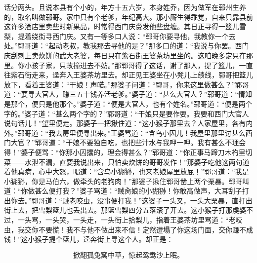 话分两头。且说本县有个小的，年方十五六岁，本身姓乔，因为做军在郓州生养的，取名叫做郓哥。家中只有个老爹，年纪高大。那小厮生得乖觉，自来只靠县前这许多酒店里卖些时新果品，时常得西门庆赍发他些盘缠。其日正寻得一篮儿雪梨，提着绕街寻西门庆。又有一等多口人说：“郓哥你要寻他，我教你一个去处。”郓哥道：“起动老叔，教我那去寻他的是？”那多口的道：“我说与你罢。西门庆刮剌上卖炊饼的武大老婆，每日只在紫石街王婆茶坊里坐的。这咱晚多定只在那里。你小孩子家，只故撞进去不妨。”那郓哥得了这话，谢了那人，提了篮儿，一直往紫石街走来，迳奔入王婆茶坊里去。却正见王婆坐在小凳儿上绩线，郓哥把篮儿放下，看着王婆道：“干娘！声喏。”那婆子问道：“郓哥，你来这里做甚么？”郓哥道：“要寻大官人，赚三五十钱养活老爹。”婆子道：“甚么大官人？”郓哥道：“情知是那个，便只是他那个。”婆子道：“便是大官人，也有个姓名。”郓哥道：“便是两个字的。”婆子道：“甚么两个字的？”郓哥道：“干娘只是要作耍。我要和西门大官人说句话儿！”望里便走。那婆子一把揪住道：“这小猴子那里去？人家屋里，各有内外。”郓哥道：“我去房里便寻出来。”王婆骂道：“含乌小囚儿！我屋里那里讨甚么西门大官？”郓哥道：“干娘不要独自吃，也把些汁水与我呷一呷。我有甚么不理会得！”婆子便骂：“你那小囚攮的，理会得甚么？”郓哥道：“你正事马蹄刀木杓里切菜——水泄不漏，直要我说出来，只怕卖炊饼的哥哥发作！”那婆子吃他这两句道着他真病，心中大怒，喝道：“含乌小猢狲，也来老娘屋里放屁！”郓哥道：“我是小猢狲，你是马伯六，做牵头的老狗肉！”那婆子揪住郓哥凿上两个栗暴。郓哥叫道：“你做甚么便打我？”婆子骂道：“贼肏娘的小猢狲！你敢高做声，大耳刮子打出你去。”郓哥道：“贼老咬虫，没事便打我！”这婆子一头叉，一头大栗暴，直打出街上去，把雪梨篮儿也丢出去。那篮雪梨四分五落滚了开去。这小猴子打那虔婆不过，一头骂，一头哭，一头走，一头街上拾梨儿，指着王婆茶坊里骂道：“老咬虫，我交你不要慌！我不与他不做出来不信！定然遭塌了你这场门面，交你赚不成钱！”这小猴子提个篮儿，迳奔街上寻这个人。却正是：

\[
掀翻孤兔窝中草，惊起鸳鸯沙上眠。
\]
